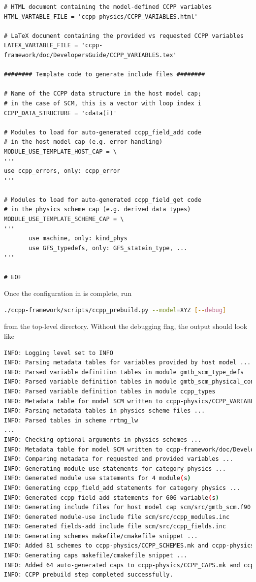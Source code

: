 \begin{lstlisting}
# HTML document containing the model-defined CCPP variables
HTML_VARTABLE_FILE = 'ccpp-physics/CCPP_VARIABLES.html'

# LaTeX document containing the provided vs requested CCPP variables
LATEX_VARTABLE_FILE = 'ccpp-framework/doc/DevelopersGuide/CCPP_VARIABLES.tex'

######## Template code to generate include files ########

# Name of the CCPP data structure in the host model cap;
# in the case of SCM, this is a vector with loop index i
CCPP_DATA_STRUCTURE = 'cdata(i)'

# Modules to load for auto-generated ccpp_field_add code
# in the host model cap (e.g. error handling)
MODULE_USE_TEMPLATE_HOST_CAP = \
'''
use ccpp_errors, only: ccpp_error
'''

# Modules to load for auto-generated ccpp_field_get code
# in the physics scheme cap (e.g. derived data types)
MODULE_USE_TEMPLATE_SCHEME_CAP = \
'''
       use machine, only: kind_phys
       use GFS_typedefs, only: GFS_statein_type, ...
'''

# EOF
\end{lstlisting}
\clearpage

Once the configuration in  is complete, run
\begin{lstlisting}[language=bash]
./ccpp-framework/scripts/ccpp_prebuild.py --model=XYZ [--debug]
\end{lstlisting}
from the top-level directory. Without the debugging flag, the output should look like
\begin{lstlisting}[language=bash,basicstyle=\scriptsize\ttfamily]
INFO: Logging level set to INFO
INFO: Parsing metadata tables for variables provided by host model ...
INFO: Parsed variable definition tables in module gmtb_scm_type_defs
INFO: Parsed variable definition tables in module gmtb_scm_physical_constants
INFO: Parsed variable definition tables in module ccpp_types
INFO: Metadata table for model SCM written to ccpp-physics/CCPP_VARIABLES_SCM.html
INFO: Parsing metadata tables in physics scheme files ...
INFO: Parsed tables in scheme rrtmg_lw
...
INFO: Checking optional arguments in physics schemes ...
INFO: Metadata table for model SCM written to ccpp-framework/doc/DevelopersGuide/CCPP_VARIABLES_SCM.tex
INFO: Comparing metadata for requested and provided variables ...
INFO: Generating module use statements for category physics ...
INFO: Generated module use statements for 4 module(s)
INFO: Generating ccpp_field_add statements for category physics ...
INFO: Generated ccpp_field_add statements for 606 variable(s)
INFO: Generating include files for host model cap scm/src/gmtb_scm.f90 ...
INFO: Generated module-use include file scm/src/ccpp_modules.inc
INFO: Generated fields-add include file scm/src/ccpp_fields.inc
INFO: Generating schemes makefile/cmakefile snippet ...
INFO: Added 81 schemes to ccpp-physics/CCPP_SCHEMES.mk and ccpp-physics/CCPP_SCHEMES.cmake
INFO: Generating caps makefile/cmakefile snippet ...
INFO: Added 64 auto-generated caps to ccpp-physics/CCPP_CAPS.mk and ccpp-physics/CCPP_CAPS.cmake
INFO: CCPP prebuild step completed successfully.
\end{lstlisting}

